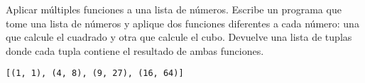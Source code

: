 \begin{exercise}
Aplicar múltiples funciones a una lista de números. Escribe un
programa que tome una lista de números y aplique dos funciones
diferentes a cada número: una que calcule el cuadrado y otra que
calcule el cubo. Devuelve una lista de tuplas donde cada tupla
contiene el resultado de ambas funciones.

\begin{Shaded}
\begin{Highlighting}[]
     \NormalTok{(}
        \NormalTok{(}
            \OperatorTok{**} \OperatorTok{**} \NormalTok{), }
\NormalTok{        )}
\NormalTok{    )}

\OperatorTok{=}\NormalTok{ [}\NormalTok{, }\NormalTok{, }\NormalTok{, }\NormalTok{]}
\OperatorTok{=}
\end{Highlighting}
\end{Shaded}

\begin{verbatim}
[(1, 1), (4, 8), (9, 27), (16, 64)]

\end{verbatim}
\end{exercise}


